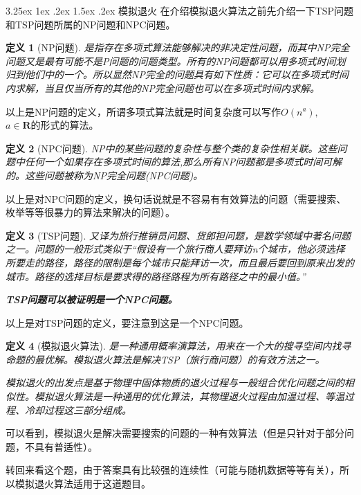 \documentclass{article}
\makeatletter
\renewcommand\paragraph{\@startsection{paragraph}{4}{\z@}%
{3.25ex \@plus1ex \@minus.2ex}%
{1.5ex \@plus.2ex}%
{\normalfont\normalsize\bfseries}}
\newtheorem{definition}{定义}[subsection]
\theoremstyle{nonumberplain}
\makeatother
\begin{document}
\paragraph{模拟退火}
在介绍模拟退火算法之前先介绍一下TSP问题和TSP问题所属的NP问题和NPC问题。
\begin{definition}[NP问题] 是指存在多项式算法能够解决的非决定性问题，而其中NP完全问题又是最有可能不是P问题的问题类型。所有的NP问题都可以用多项式时间划归到他们中的一个。所以显然NP完全的问题具有如下性质：它可以在多项式时间内求解，当且仅当所有的其他的NP完全问题也可以在多项式时间内求解。
\end{definition}
以上是NP问题的定义，所谓多项式算法就是时间复杂度可以写作$O(n^a), $\\$a\in \mathbf{R}$的形式的算法。
\begin{definition}[NPC问题]NP中的某些问题的复杂性与整个类的复杂性相关联。这些问题中任何一个如果存在多项式时间的算法,那么所有NP问题都是多项式时间可解的。这些问题被称为NP完全问题(NPC问题)。
\end{definition}
	以上是对NPC问题的定义，换句话说就是不容易有有效算法的问题（需要搜索、枚举等等很暴力的算法来解决的问题）。
	\begin{definition}[TSP问题]又译为旅行推销员问题、货郎担问题，是数学领域中著名问题之一。问题的一般形式类似于“假设有一个旅行商人要拜访n个城市，他必须选择所要走的路径，路径的限制是每个城市只能拜访一次，而且最后要回到原来出发的城市。路径的选择目标是要求得的路径路程为所有路径之中的最小值。”

		\textbf{TSP问题可以被证明是一个NPC问题。}
	\end{definition}
	以上是对TSP问题的定义，要注意到这是一个NPC问题。
	\begin{definition}[模拟退火算法]是一种通用概率演算法，用来在一个大的搜寻空间内找寻命题的最优解。模拟退火算法是解决TSP（旅行商问题）的有效方法之一。

		模拟退火的出发点是基于物理中固体物质的退火过程与一般组合优化问题之间的相似性。模拟退火算法是一种通用的优化算法，其物理退火过程由加温过程、等温过程、冷却过程这三部分组成。
	\end{definition}
	可以看到，模拟退火是解决需要搜索的问题的一种有效算法（但是只针对于部分问题，不具有普适性）。

	转回来看这个题，由于答案具有比较强的连续性（可能与随机数据等等有关），所以模拟退火算法适用于这道题目。
\end{document}
